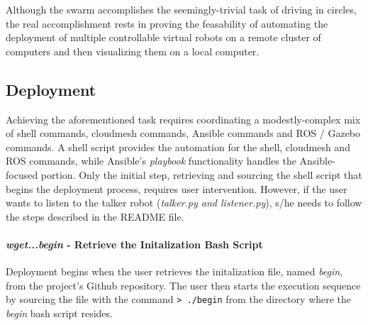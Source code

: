 \documentclass[9pt,twocolumn,twoside]{../../styles/osajnl}
\begin{document}
Although the swarm accomplishes the seemingly-trivial task of driving in circles, the real accomplishment rests in proving the feasability of automating the deployment of multiple controllable virtual robots on a remote cluster of computers and then visualizing them on a local computer.

\subsection{Deployment}
Achieving the aforementioned task requires coordinating a modestly-complex mix of shell commands, cloudmesh commands, Ansible commands and ROS / Gazebo commands. A shell script provides the automation for the shell, cloudmesh and ROS commands, while Ansible's \textit{playbook} functionality handles the Ansible-focused portion.  Only the initial step, retrieving and sourcing the shell script that begins the deployment process, requires user intervention.  However, if the user wants to listen to the talker robot (\textit{talker.py and listener.py}), s/he needs to follow the steps described in the README file.

\paragraph{\textit{wget...begin} - Retrieve the Initalization Bash Script}
Deployment begins when the user retrieves the initalization file, named \textit{begin}, from the project's Github repository.  The user then starts the execution sequence by sourcing the file with the command \newline
{\color{green} \lstinline[style=BashInputStyle]!> ./begin! } \newline
from the directory where the \textit{begin} bash script resides.  
\end{document}
